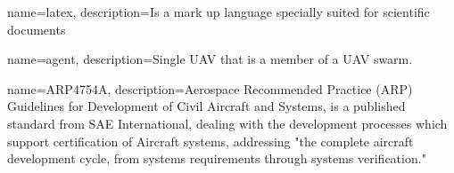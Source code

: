 \glstoctrue
\makeglossaries

{
        name=latex,
        description={Is a mark up language specially suited for scientific documents}
}

{
        name=agent,
        description={Single UAV that is a member of a UAV swarm.}
}

{
        name=ARP4754A,
        description={Aerospace Recommended Practice (ARP) Guidelines for Development of Civil Aircraft and Systems, is a published standard from SAE International, dealing with the development processes which support certification of Aircraft systems, addressing "the complete aircraft development cycle, from systems requirements through systems verification."}
}



%

